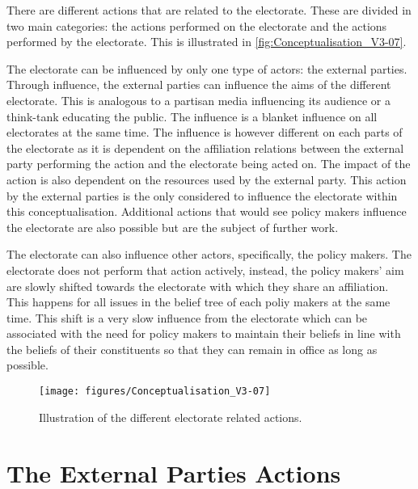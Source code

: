 There are different actions that are related to the electorate. These are divided in two main categories: the actions performed on the electorate and the actions performed by the electorate. This is illustrated in \autoref{fig:Conceptualisation_V3-07}.

The electorate can be influenced by only one type of actors: the external parties. Through influence, the external parties can influence the aims of the different electorate. This is analogous to a partisan media influencing its audience or a think-tank educating the public. The influence is a blanket influence on all electorates at the same time. The influence is however different on each parts of the electorate as it is dependent on the affiliation relations between the external party performing the action and the electorate being acted on. The impact of the action is also dependent on the resources used by the external party. This action by the external parties is the only considered to influence the electorate within this conceptualisation.  Additional actions that would see policy makers influence the electorate are also possible but are the subject of further work.

The electorate can also influence other actors, specifically, the policy makers. The electorate does not perform that action actively, instead, the policy makers' aim are slowly shifted towards the electorate with which they share an affiliation. This happens for all issues in the belief tree of each poliy makers at the same time. This shift is a very slow influence from the electorate which can be associated with the need for policy makers to maintain their beliefs in line with the beliefs of their constituents so that they can remain in office as long as possible.

\begin{figure}
\centering
\texttt{[image: figures/Conceptualisation\_V3-07]}
\caption{Illustration of the different electorate related actions.}
\label{fig:Conceptualisation_V3-07}
\end{figure}

%
\section{The External Parties Actions}
\label{sec:EPActions}

